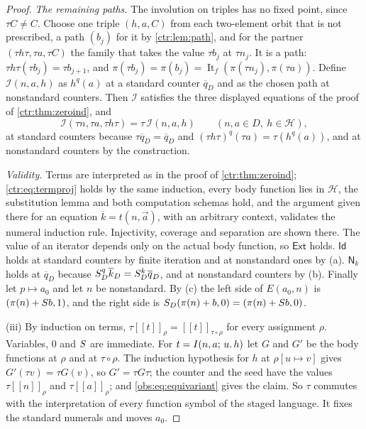 \begin{proof}
\emph{The remaining paths.} The involution on triples has no fixed point,
since $\tau C\ne C$. Choose one triple $(h,a,C)$ from each two-element orbit
that is not prescribed, a path $(b_j)$ for it by \cref{ctr:lem:path}, and for
the partner $(\tau h\tau,\tau a,\tau C)$ the family that takes the value
$\tau b_j$ at $\tau n_j$. It is a path: $\tau h\tau(\tau b_j)=\tau b_{j+1}$, and
$\pi(\tau b_j)=\pi(b_j)=\operatorname{It}_f(\pi(\tau n_j),\pi(\tau a))$. Define
$\mathcal{I}(n,a,h)$ as $h^{q}(a)$ at a standard counter $\overline{q}_D$ and as
the chosen path at nonstandard counters. Then $\mathcal{I}$ satisfies the three
displayed equations of the proof of \cref{ctr:thm:zeroind}, and
\begin{equation}
\label{obs:eq:equivariant}
\mathcal{I}(\tau n,\tau a,\tau h\tau)=\tau\,\mathcal{I}(n,a,h)
\qquad(n,a\in D,\ h\in\mathscr{H}),
\end{equation}
at standard counters because $\tau\overline{q}_D=\overline{q}_D$ and
$(\tau h\tau)^{q}(\tau a)=\tau(h^{q}(a))$, and at nonstandard counters by the
construction.

\emph{Validity.} Terms are interpreted as in the proof of \cref{ctr:thm:zeroind};
\eqref{ctr:eq:termproj} holds by the same induction, every body function lies
in $\mathscr{H}$, the substitution lemma and both computation schemas hold, and
the argument given there for an equation $\overline{k}=t(n,\vec a)$, with an
arbitrary context, validates the numeral induction rule. Injectivity, coverage
and separation are shown there. The value of an iterator depends only on the
actual body function, so $\mathsf{Ext}$ holds. $\mathsf{Id}$ holds at standard
counters by finite iteration and at nonstandard ones by (a). $\mathsf{N}_k$
holds at $\overline{q}_D$ because $S_D^{q}\overline{k}_D=S_D^{k}\overline{q}_D$,
and at nonstandard counters by (b). Finally let $p\mapsto a_0$ and let $n$ be
nonstandard. By (c) the left side of $E(a_0,n)$ is $(\pi(n)+S b,1)$, and
the right side is $S_D(\pi(n)+b,0)=(\pi(n)+S b,0)$.

(iii) By induction on terms, $\tau[\![t]\!]_\rho=[\![t]\!]_{\tau\circ\rho}$
for every assignment $\rho$. Variables, $0$ and $S$ are immediate. For
$t=I(n,a;\,u.\,h)$ let $G$ and $G'$ be the body functions at $\rho$ and at
$\tau\circ\rho$. The induction hypothesis for $h$ at $\rho[u\mapsto v]$ gives
$G'(\tau v)=\tau G(v)$, so $G'=\tau G\tau$; the counter and the seed have the
values $\tau[\![n]\!]_\rho$ and $\tau[\![a]\!]_\rho$; and
\eqref{obs:eq:equivariant} gives the claim. So $\tau$ commutes with the
interpretation of every function symbol of the staged language. It fixes the
standard numerals and moves $a_0$.
\end{proof}

